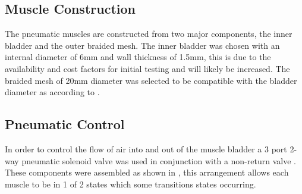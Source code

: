\documentclass[11pt,a4paper]{article}
\begin{document}
\subsection{Muscle Construction}
\label{sub:muscle_construction}

The pneumatic muscles are constructed from two major components, the inner bladder and the outer braided mesh. The inner bladder was chosen with an internal diameter of 6mm and wall thickness of 1.5mm, this is due to the availability and cost factors for initial testing and will likely be increased. The braided mesh of 20mm diameter was selected to be compatible with the bladder diameter as according to \cite{andrikopoulos_nikolakopoulos_2017}.

\subsection{Pneumatic Control}
\label{sub:pneumatic_control}

In order to control the flow of air into and out of the muscle bladder a 3 port 2-way pneumatic solenoid valve was used in conjunction with a non-return valve \cite{airsky_pneumatic}. These components were assembled as shown in , this arrangement allows each muscle to be in 1 of 2 states which some transitions states occurring.
\end{document}
